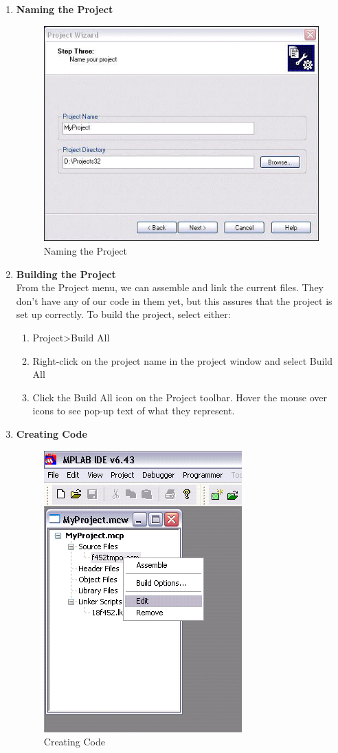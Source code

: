 \documentclass[12pt,a4paper,oneside,openright]{report}
\begin{document}
\begin{enumerate}
 \item \textbf{Naming the Project}
\begin{figure}[!h]
 \centering
 \includegraphics[width = \textwidth]{Figures/17.jpg}
 \caption{Naming the Project}
 \label{Naming the Project}
\end{figure}
\item \textbf{Building the Project}\\
From the Project menu, we can assemble and link the current files. They don’t have any of our code in them yet, but this assures that the project is set up correctly.
To build the project, select either:
\begin{enumerate}
 \item Project>Build All
\item Right-click on the project name in the project window and select Build All
\item Click the Build All icon on the Project toolbar. Hover the mouse over icons to see pop-up text of what they represent.
\end{enumerate}
\newpage
\item \textbf{Creating Code}
\begin{figure}[!h]
 \centering
 \includegraphics[width = .40\textwidth]{Figures/18.jpg}
 \caption{Creating Code}
 \label{Creating Code}
\end{figure}


\end{enumerate}
\end{document}
